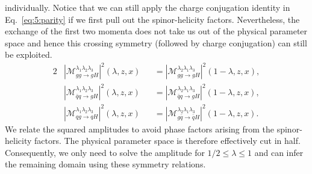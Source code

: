 individually. Notice that we can still apply the charge conjugation identity in Eq.~\eqref{eq:5:parity} if we first pull out the spinor-helicity factors. Nevertheless, the exchange of the first two momenta does not take us out of the physical parameter space and hence this crossing symmetry (followed by charge conjugation) can still be exploited.
\begin{alignat}{2}
& |\mathcal{M}_{gg \rightarrow g H}^{\lambda_1 \lambda_2 \lambda_3} |^2(\lambda, z, x) &&= |\mathcal{M}_{gg \rightarrow g H}^{\lambda_2 \lambda_1 \lambda_3}|^2 (1 - \lambda, z, x), \label{eq:5:symmetry_1} \\
& |\mathcal{M}_{\bar{q}q \rightarrow g H}^{\lambda_1 \lambda_2 \lambda_3}|^2 (\lambda , z, x) &&= |\mathcal{M}_{\bar{q} q \rightarrow g H}^{\lambda_2 \lambda_1 \lambda_3}|^2 (1 - \lambda , z, x),\label{eq:5:symmetry_2} \\
& |\mathcal{M}_{qg \rightarrow qH}^{\lambda_1 \lambda_2 \lambda_3}|^2 (\lambda, z, x) &&= |\mathcal{M}_{g \bar{q} \rightarrow \bar{q} H}^{\lambda_2 \lambda_1 \lambda_3}|^2 (1 - \lambda, z, x). \label{eq:5:symmetry_3}
\end{alignat}
We relate the squared amplitudes to avoid phase factors arising from the spinor-helicity factors. The physical parameter space is therefore effectively cut in half. Consequently, we only need to solve the amplitude for $1/2 \le \lambda \le 1$ and can infer the remaining domain using these symmetry relations.

